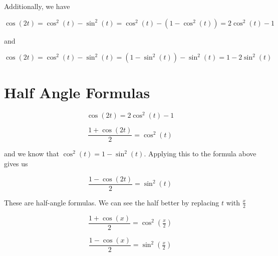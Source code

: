 \documentclass{ximera}
\begin{document}
Additionally, we have 




\[   \cos(2t) =    \cos^2(t) - \sin^2(t)  =    \cos^2(t) - (1 - \cos^2(t)) =  2 \cos^2(t) - 1 \]


and

\[   \cos(2t) =    \cos^2(t) - \sin^2(t)  =    (1 - \sin^2(t)) - \sin^2(t)  = 1 - 2 \sin^2(t)     \]




































\section{Half Angle Formulas}



\[   \cos(2t)  =  2 \cos^2(t) - 1 \]


\[   \frac{1 + \cos(2t)}{2}  =   \cos^2(t)  \]



and we know that $\cos^2(t) = 1- \sin^2(t)$. Applying this to the formula above gives us

\[  \frac{1 -  \cos(2t)}{2}  =  \sin^2(t)     \]



These are half-angle formulas.  We can see the half better by replacing $t$ with $\frac{x}{2}$



\[   \frac{1 + \cos(x)}{2}  =   \cos^2\left( \tfrac{x}{2} \right)  \]



\[   \frac{1 - \cos(x)}{2}  =   \sin^2\left( \tfrac{x}{2} \right)  \]
\end{document}
